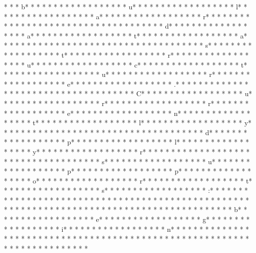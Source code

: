 * *  * b* * *  * * *  * * *  *  * * *  *  * * *  * u* * *  * * *  * * *  *  * * *  *  * * *  * l* * *  * * *  * * *  *  * * *  *  * * *  * a* * *  * * *  * * *  *  * * *  *  * * *  * r* * *  * * *  * * *  *  * * *  *  * * *  *  * * *  * * *  * * *  *  * * *  *  * * *  * d* * *  * * *  * * *  *  * * *  *  * * *  * a* * *  * * *  * * *  *  * * *  *  * * *  * t* * *  * * *  * * *  *  * * *  *  * * *  * a* * *  * * *  * * *  *  * * *  *  * * *  *  * * *  * * *  * * *  *  * * *  *  * * *  * s* * *  * * *  * * *  *  * * *  *  * * *  * t* * *  * * *  * * *  *  * * *  *  * * *  * r* * *  * * *  * * *  *  * * *  *  * * *  * u* * *  * * *  * * *  *  * * *  *  * * *  * c* * *  * * *  * * *  *  * * *  *  * * *  * t* * *  * * *  * * *  *  * * *  *  * * *  * u* * *  * * *  * * *  *  * * *  *  * * *  * r* * *  * * *  * * *  *  * * *  *  * * *  * e* * *  * * *  * * *  *  * * *  *  * * *  * .* * *  * * *  * * *  *  * * *  *  * * *  *  * * *  * * *  * * *  *  * * *  *  * * *  * C* * *  * * *  * * *  *  * * *  *  * * *  * u* * *  * * *  * * *  *  * * *  *  * * *  * r* * *  * * *  * * *  *  * * *  *  * * *  * r* * *  * * *  * * *  *  * * *  *  * * *  * e* * *  * * *  * * *  *  * * *  *  * * *  * n* * *  * * *  * * *  *  * * *  *  * * *  * t* * *  * * *  * * *  *  * * *  *  * * *  * l* * *  * * *  * * *  *  * * *  *  * * *  * y* * *  * * *  * * *  *  * * *  *  * * *  *  * * *  * * *  * * *  *  * * *  *  * * *  * d* * *  * * *  * * *  *  * * *  *  * * *  * p* * *  * * *  * * *  *  * * *  *  * * *  * l* * *  * * *  * * *  *  * * *  *  * * *  * y* * *  * * *  * * *  *  * * *  *  * * *  * r* * *  * * *  * * *  *  * * *  *  * * *  *  * * *  * * *  * * *  *  * * *  *  * * *  * s* * *  * * *  * * *  *  * * *  *  * * *  * u* * *  * * *  * * *  *  * * *  *  * * *  * p* * *  * * *  * * *  *  * * *  *  * * *  * p* * *  * * *  * * *  *  * * *  *  * * *  * o* * *  * * *  * * *  *  * * *  *  * * *  * r* * *  * * *  * * *  *  * * *  *  * * *  * t* * *  * * *  * * *  *  * * *  *  * * *  * s* * *  * * *  * * *  *  * * *  *  * * *  * :* * *  * * *  * * *  *  * * *  *  * * *  * 
* * *  * * *  * * *  *  * * *  *  * * *  * 	* * *  * * *  * * *  *  * * *  *  * * *  * 
* * *  * * *  * * *  *  * * *  *  * * *  * 	* * *  * * *  * * *  *  * * *  *  * * *  * b* * *  * * *  * * *  *  * * *  *  * * *  * e* * *  * * *  * * *  *  * * *  *  * * *  * g* * *  * * *  * * *  *  * * *  *  * * *  * i* * *  * * *  * * *  *  * * *  *  * * *  * n* * *  * * *  * * *  *  * * *  *  * * *  * {* * *  * * *  * * *  *  * * *  *  * * *  *  * * *  * * *  * * *  *  * * *  *  * * *  * }* * *  * * *  * * *  *  * * *  *  * * *  * 
